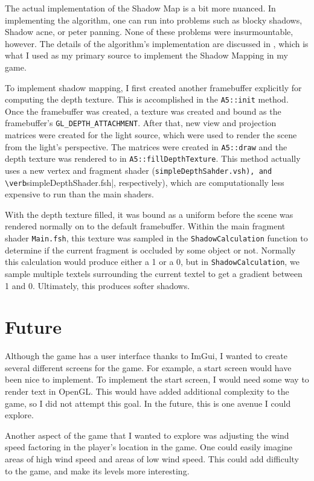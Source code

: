 \documentclass[11pt]{report}
\begin{document}
The actual implementation of the Shadow Map is a bit more nuanced. In implementing the algorithm, one can run into problems such as blocky shadows, Shadow acne, or peter panning. None of these problems were insurmountable, however. The details of the algorithm's implementation are discussed in \cite{shadow-map-learn-opengl}, which is what I used as my primary source to implement the Shadow Mapping in my game.

To implement shadow mapping, I first created another framebuffer explicitly for computing the depth texture. This is accomplished in the \verb|A5::init| method. Once the framebuffer was created, a texture was created and bound as the framebuffer's \verb|GL_DEPTH_ATTACHMENT|. After that, new view and projection matrices were created for the light source, which were used to render the scene from the light's perspective. The matrices were created in \verb|A5::draw| and the depth texture was rendered to in \verb|A5::fillDepthTexture|. This method actually uses a new vertex and fragment shader (\verb|simpleDepthSahder.vsh), and \verb|simpleDepthShader.fsh|, respectively), which are computationally less expensive to run than the main shaders.

With the depth texture filled, it was bound as a uniform before the scene was rendered normally on to the default framebuffer. Within the main fragment shader \verb|Main.fsh|, this texture was sampled in the \verb|ShadowCalculation| function to determine if the current fragment is occluded by some object or not. Normally this calculation would produce either a 1 or a 0, but in \verb|ShadowCalculation|, we sample multiple textels surrounding the current textel to get a gradient between 1 and 0. Ultimately, this produces softer shadows.

\section{Future}
Although the game has a user interface thanks to ImGui, I wanted to create several different screens for the game. For example, a start screen would have been nice to implement. To implement the start screen, I would need some way to render text in OpenGL. This would have added additional complexity to the game, so I did not attempt this goal. In the future, this is one avenue I could explore.

Another aspect of the game that I wanted to explore was adjusting the wind speed factoring in the player's location in the game. One could easily imagine areas of high wind speed and areas of low wind speed. This could add difficulty to the game, and make its levels more interesting.
\end{document}
